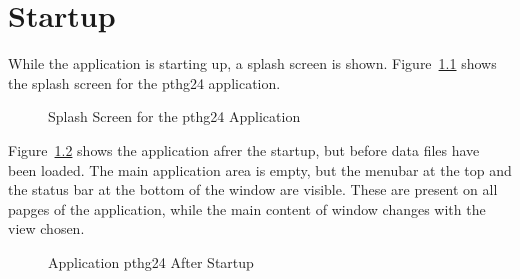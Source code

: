 \chapter{Startup}
While the application is starting up, a splash screen is shown.
Figure~\ref{splash} shows the splash screen for the pthg24 application.

\begin{figure}[htbp]
\caption{\label{splash}Splash Screen for the pthg24 Application}
\begin{center}
\end{center}
\end{figure}

Figure~\ref{empty} shows the application afrer the startup, but before data files have been loaded. The main application area is empty, but the menubar at the top and the status bar at the bottom of the window are visible. These are present on all papges of the application, while the main content of window changes with the view chosen.

\begin{figure}[htbp]
\caption{\label{empty}Application pthg24 After Startup}
\begin{center}
\end{center}
\end{figure}

